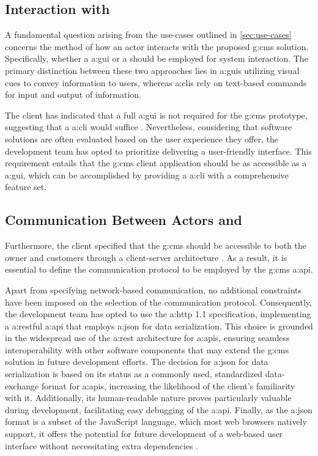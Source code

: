 \subsection{Interaction with }\label{sec:req-interaction}
A fundamental question arising from the use-cases outlined in \cref{sec:use-cases} concerns the method of how an actor interacts with the proposed \gls{g:cms} solution. Specifically, whether a \gls{a:gui} or a  should be employed for system interaction. The primary distinction between these two approaches lies in \glspl{a:gui} utilizing visual cues to convey information to users, whereas \glspl{a:cli} rely on text-based commands for input and output of information.

The client has indicated that a full \gls{a:gui} is not required for the \gls{g:cms} prototype, suggesting that a \gls{a:cli} would suffice \cite[2]{IIS2-ass}. Nevertheless, considering that software solutions are often evaluated based on the user experience they offer, the development team has opted to prioritize delivering a user-friendly interface. This requirement entails that the \gls{g:cms} client application should be as accessible as a \gls{a:gui}, which can be accomplished by providing a \gls{a:cli} with a comprehensive feature set.

\subsection{Communication Between Actors and }\label{sec:req-protocol}

Furthermore, the client specified that the \gls{g:cms} should be accessible to both the owner and customers through a client-server architecture \cite[2]{IIS2-ass}. As a result, it is essential to define the communication protocol to be employed by the \gls{g:cms} \gls{a:api}.

Apart from specifying network-based communication, no additional constraints have been imposed on the selection of the communication protocol. Consequently, the development team has opted to use the \gls{a:http} 1.1 specification, implementing a \gls{a:rest}ful \gls{a:api} that employs \gls{a:json} for data serialization. This choice is grounded in the widespread use of the \gls{a:rest} architecture for \glspl{a:api}, ensuring seamless interoperability with other software components that may extend the \gls{g:cms} solution in future development efforts. The decision for \gls{a:json} for data serialization is based on its status as a commonly used, standardized data-exchange format for \glspl{a:api}, increasing the likelihood of the client's familiarity with it. Additionally, its human-readable nature proves particularly valuable during development, facilitating easy debugging of the \gls{a:api}. Finally, as the \gls{a:json} format is a subset of the JavaScript language, which most web browsers natively support, it offers the potential for future development of a web-based user interface without necessitating extra dependencies \cite{rfc8259}.

